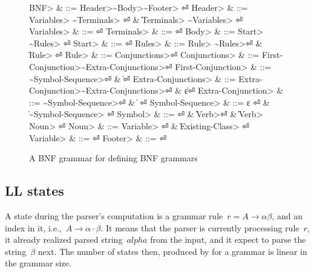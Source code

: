 \begin{figure}[H]
  \begin{Grammar}
    \begin{aligned}
      \<BNF>                     & ::= \<Header>\~\<Body>\~\<Footer> \hfill⏎
      \<Header>                  & ::= \<Variables> \~\<Terminals> \hfill⏎
      {}                         & \| \<Terminals> \~\<Variables> \hfill⏎
      \<Variables>               & ::= \hfill⏎
      \<Terminals>               & ::= \hfill⏎
      \<Body>                    & ::= \<Start> \~\<Rules> \hfill⏎
      \<Start>                   & ::=  \hfill⏎
      \<Rules>                   & ::= \<Rule> \~\<Rules>\hfill⏎
      {}                         & \| \<Rule> \hfill⏎
      \<Rule>                    & ::=  \<Conjunctions>\hfill⏎
      \<Conjunctions>            & ::= \<First-Conjunction>\~\<Extra-Conjunctions>\hfill⏎
      \<First-Conjunction>       & ::= \~\<Symbol-Sequence>\hfill⏎
      {}                         & \| \hfill⏎
      \<Extra-Conjunctions> & ::= \<Extra-Conjunction>\~\<Extra-Conjunctions>\hfill⏎
      {}                         & \| ε\hfill⏎
      \<Extra-Conjunction>  & ::= \~\<Symbol-Sequence>\hfill⏎
      {}                         & \|  \hfill⏎
      \<Symbol-Sequence>         & ::= ε \hfill⏎
      {}                         & \| \~\<Symbol-Sequence> \hfill⏎
      \<Symbol>                  & ::=  \hfill⏎
      {}                         & \| \<Verb>\hfill⏎
      {}                         & \| \<Verb> \cc{,} \<Noun> \hfill⏎
      \<Noun>                    & ::= \<Variable> \hfill⏎
      {}                         & \| \<Existing-Class> \hfill⏎
      \<Variable>                & ::=  \hfill⏎
      \<Footer>                  & ::= \hfill⏎
    \end{aligned}
  \end{Grammar}
  \caption{A BNF grammar for defining BNF grammars}
  \label{Figure:BNF:BNF}
\end{figure}

%
\subsection{LL states}
A state during the parser's computation is a grammar rule~$r = A→αβ$, and an
index in it, i.e.,~$A→α·β$.
It means that the parser is currently processing rule~$r$, it already realized parsed string~$alpha$
  from the input, and it expect to parse the string~$β$ next.
The number of states then, produced by \Fajita for a grammar is linear in the grammar size.

